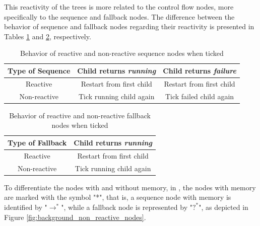 This reactivity of the trees is more related to the control flow nodes, more specifically to the sequence and fallback nodes. The difference between the behavior of sequence and fallback nodes regarding their reactivity is presented in Tables \ref{tab:sequence_reactivity} and \ref{tab:fallback_reactivity}, respectively.

\begin{table}[h]
    \centering
    \begin{tabular}{c c c}
        \toprule
        Type of Sequence & Child returns \textit{running} & Child returns \textit{failure} \\
        \midrule
        Reactive         & Restart from first child       & Restart from first child       \\
        Non-reactive     & Tick running child again       & Tick failed child again        \\
        \bottomrule
    \end{tabular}
    \caption{Behavior of reactive and non-reactive sequence nodes when ticked}
    \label{tab:sequence_reactivity}
\end{table}

\begin{table}[h]
    \centering
    \begin{tabular}{c c}
        \toprule
        Type of Fallback & Child returns \textit{running} \\
        \midrule
        Reactive         & Restart from first child       \\
        Non-reactive     & Tick running child again       \\
        \bottomrule
    \end{tabular}
    \caption{Behavior of reactive and non-reactive fallback nodes when ticked}
    \label{tab:fallback_reactivity}
\end{table}

To differentiate the nodes with and without memory, in \cite{BTsInRobotics}, the nodes with memory are marked with the symbol "*", that is, a sequence node with memory is identified by "$\rightarrow^*$", while a fallback node is represented by "$?^*$", as depicted in Figure \ref{fig:background_non_reactive_nodes}.

